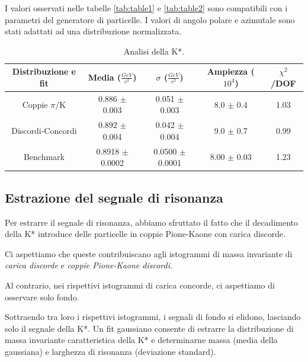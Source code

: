 \documentclass[12pt, a4paper]{article}
\begin{document}
I valori osservati nelle tabelle \ref{tab:table1} e \ref{tab:table2} sono compatibili con i parametri del generatore di particelle.
I valori di angolo polare e azimutale sono stati adattati ad una distribuzione normalizzata.

\begin{table}[H]
  \begin{center}
    \caption{Analisi della K*.}
    \label{tab:table3}
    \begin{tabular}{c|c|c|c|c} %
      \textbf{Distribuzione e fit} & 
      \textbf{Media ($\frac{GeV}{c^2}$)} & 
      \textbf{$\sigma$ ($\frac{GeV}{c^2}$)} & 
      \textbf{Ampiezza ($10^4$)} & 
      \textbf{$\chi^2$/DOF}\\
      
      \hline
      Coppie $\pi$/K  & 0.886 $\pm$ 0.003 &0.051 $\pm$ 0.003  & 8.0 $\pm$ 0.4 & 1.03\\
      Discordi-Concordi & 0.892 $\pm$ 0.004 & 0.042 $\pm$ 0.004 & 9.0 $\pm$ 0.7 & 0.99\\
      Benchmark & 0.8918 $\pm$ 0.0002 & 0.0500 $\pm$ 0.0001 & 8.00 $\pm$ 0.03  &  1.23\\
    \end{tabular}
  \end{center}
\end{table}

\subsection{Estrazione del segnale di risonanza}
Per estrarre il segnale di risonanza, abbiamo sfruttato il fatto che il decadimento della K* introduce delle particelle in coppie Pione-Kaone con carica discorde. 

Ci aspettiamo che queste contribuiscano agli istogrammi di massa invariante di \textit{carica discorde} e \textit{coppie Pione-Kaone discordi}.

Al contrario, nei rispettivi istogrammi di carica concorde, ci aspettiamo di osservare solo fondo.

Sottraendo tra loro i rispettivi istogrammi, i segnali di fondo si elidono, lasciando solo il segnale della K*.
Un fit gaussiano consente di estrarre la distribuzione di massa invariante caratteristica della K* e determinarne massa (media della gaussiana) e larghezza di risonanza (deviazione standard).
\end{document}
